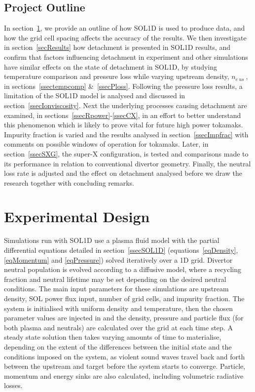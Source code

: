\documentclass[12pt]{article}  %
\providecommand{\neus}{$n_{e~us}~$} %
\begin{document}
\subsection{Project Outline}\label{ssecOutline}
In section~\ref{secExpt}, we provide an outline of how SOL1D is used to produce data, and how the grid cell spacing affects the accuracy of the results. We then investigate in section~\ref{secResults} how detachment is presented in SOL1D results, and confirm that factors influencing detachment in experiment and other simulations have similar effects on the state of detachment in SOL1D, by studying temperature comparison and pressure loss while varying upstream density, \neus, in sections~\ref{ssectempcomp} \&~\ref{ssecPloss}. Following the pressure loss results, a limitation of the SOL1D model is analysed and discussed in section~\ref{ssecIonviscosity}.  Next the underlying processes causing detachment are examined, in sections~\ref{ssecRpower}-\ref{ssecCX}, in an effort to better understand this phenomenon which is likely to prove vital for future high power tokamaks. Impurity fraction is varied and the results analysed in section~\ref{ssecImpfrac} with comments on possible windows of operation for tokamaks. Later, in section~\ref{ssecSXG}, the super-X configuration, is tested and comparisons made to its performance in relation to conventional divertor geometry. Finally, the neutral loss rate is adjusted and the effect on detachment analysed before we draw the research together with concluding remarks.


\section{Experimental Design}\label{secExpt}
Simulations run with SOL1D use a plasma fluid model with the partial differential equations detailed in section~\ref{ssecSOL1D} (equations~\ref{eqDensity}, \ref{eqMomentum} and \ref{eqPressure}) solved iteratively over a 1D grid. Divertor neutral population is evolved according to a diffusive model, where a recycling fraction and neutral lifetime may be set depending on the desired neutral conditions. The main input parameters for these simulations are upstream density, SOL power flux input, number of grid cells, and impurity fraction. The system is initialised with uniform density and temperature, then the chosen parameter values are injected in and the density, pressure and particle flux (for both plasma and neutrals) are calculated over the grid at each time step. A steady state solution then takes varying amounts of time to materialise, depending on the extent of the differences between the initial state and the conditions imposed on the system, as violent sound waves travel back and forth between the upstream and target before the system starts to converge. Particle, momentum and energy sinks are also calculated, including volumetric radiative losses.
\end{document}
